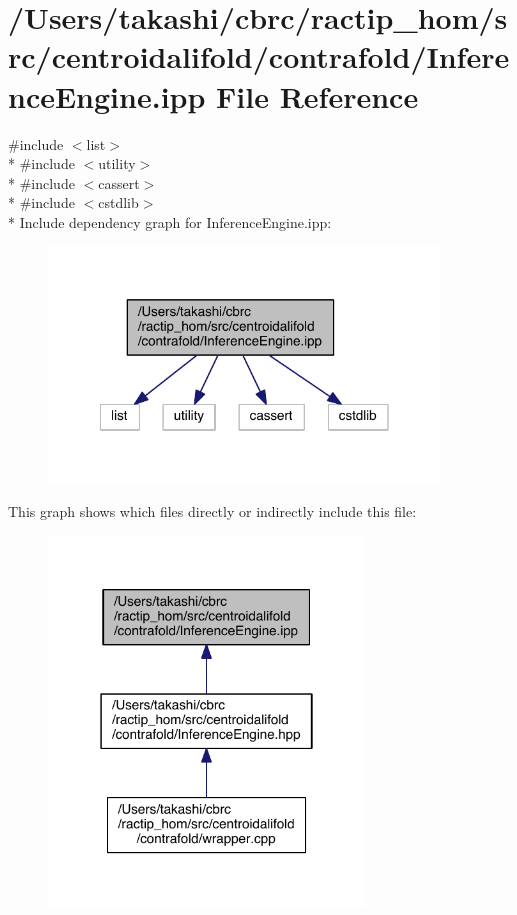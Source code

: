 \hypertarget{centroidalifold_2contrafold_2_inference_engine_8ipp}{\section{/\+Users/takashi/cbrc/ractip\+\_\+hom/src/centroidalifold/contrafold/\+Inference\+Engine.ipp File Reference}
\label{centroidalifold_2contrafold_2_inference_engine_8ipp}
}
{\ttfamily \#include $<$list$>$}\\*
{\ttfamily \#include $<$utility$>$}\\*
{\ttfamily \#include $<$cassert$>$}\\*
{\ttfamily \#include $<$cstdlib$>$}\\*
Include dependency graph for Inference\+Engine.\+ipp\+:
\nopagebreak
\begin{figure}[H]
\begin{center}
\leavevmode
\includegraphics[width=295pt]{centroidalifold_2contrafold_2_inference_engine_8ipp__incl}
\end{center}
\end{figure}
This graph shows which files directly or indirectly include this file\+:
\nopagebreak
\begin{figure}[H]
\begin{center}
\leavevmode
\includegraphics[width=238pt]{centroidalifold_2contrafold_2_inference_engine_8ipp__dep__incl}
\end{center}
\end{figure}
